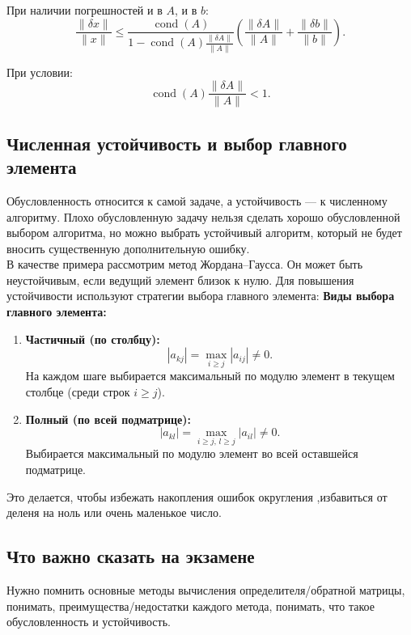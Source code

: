 При наличии погрешностей и в $A$, и в $b$:
\[
\frac{\|\delta x\|}{\|x\|} \leq \frac{\operatorname{cond}(A)}{1 - \operatorname{cond}(A) \frac{\|\delta A\|}{\|A\|}} \left( \frac{\|\delta A\|}{\|A\|} + \frac{\|\delta b\|}{\|b\|} \right).
\]

При условии:
\[
\operatorname{cond}(A) \frac{\|\delta A\|}{\|A\|} < 1.
\]

\subsection{Численная устойчивость и выбор главного элемента}

Обусловленность относится к самой задаче, а устойчивость — к численному алгоритму. Плохо обусловленную задачу нельзя сделать хорошо обусловленной выбором алгоритма, но можно выбрать устойчивый алгоритм, который не будет вносить существенную дополнительную ошибку. \\

В качестве примера рассмотрим метод Жордана--Гаусса. Он может быть неустойчивым, если ведущий элемент близок к нулю. Для повышения устойчивости используют стратегии выбора главного элемента:
\textbf{Виды выбора главного элемента:}
\begin{enumerate}
	\item \textbf{Частичный (по столбцу):} 
	\[
	|a_{kj}| = \max_{i \geq j} |a_{ij}| \neq 0.
	\]
	На каждом шаге выбирается максимальный по модулю элемент в текущем столбце (среди строк $i \geq j$).
	
	\item \textbf{Полный (по всей подматрице):}
	\[
	|a_{kl}| = \max_{i \geq j, \, l \geq j} |a_{il}| \neq 0.
	\]
	Выбирается максимальный по модулю элемент во всей оставшейся подматрице.
\end{enumerate}

Это делается, чтобы избежать накопления ошибок округления ,избавиться от деленя на ноль или очень маленькое число.

\subsection{Что важно сказать на экзамене}

Нужно помнить основные методы вычисления определителя/обратной матрицы, понимать, преимущества/недостатки каждого метода, понимать, что такое обусловленность и устойчивость.

\newpage